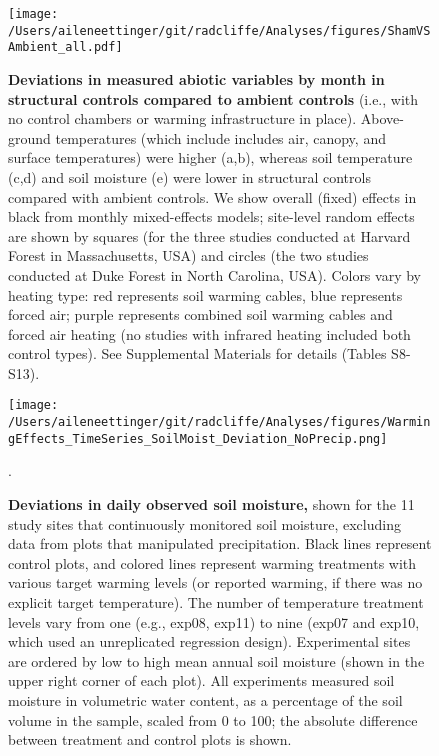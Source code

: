 \documentclass{article}
\begin{document}
 \begin{figure}[p]
\centering
\texttt{[image: /Users/aileneettinger/git/radcliffe/Analyses/figures/ShamVSAmbient\_all.pdf]} 
 \caption{\textbf{Deviations in measured abiotic variables by month in structural controls compared to ambient controls} (i.e., with no control chambers or warming infrastructure in place). Above-ground temperatures (which include includes air, canopy, and surface temperatures) were higher (a,b), whereas soil temperature (c,d) and soil moisture (e) were lower in structural controls compared with ambient controls. We show overall (fixed) effects in black from monthly mixed-effects models; site-level random effects are shown by squares (for the three studies conducted at Harvard Forest in Massachusetts, USA) and circles (the two studies conducted at Duke Forest in North Carolina, USA). Colors vary by heating type: red represents soil warming cables, blue represents forced air; purple represents combined soil warming cables and forced air heating (no studies with infrared heating included both control types). See Supplemental Materials for details (Tables S8-S13). }
 \label{fig:shamamb}
 \end{figure}
\clearpage
 \begin{figure}[h]
 \centering
 \texttt{[image: /Users/aileneettinger/git/radcliffe/Analyses/figures/WarmingEffects\_TimeSeries\_SoilMoist\_Deviation\_NoPrecip.png]} 
 \caption{\textbf{Deviations in daily observed soil moisture,} shown for the 11 study sites that continuously monitored soil moisture, excluding data from plots that manipulated precipitation. Black lines represent control plots, and colored lines represent warming treatments with various target warming levels (or reported warming, if there was no explicit target temperature). The number of temperature treatment levels vary from one (e.g., exp08, exp11) to nine (exp07 and exp10, which used an unreplicated regression design). Experimental sites are ordered by low to high mean annual soil moisture (shown in the upper right corner of each plot). All experiments measured soil moisture in volumetric water content, as a percentage of the soil volume in the sample, scaled from 0 to 100; the absolute difference between treatment and control plots is shown.}. 
 \label{fig:mois}
 \end{figure}
 
\end{document}
